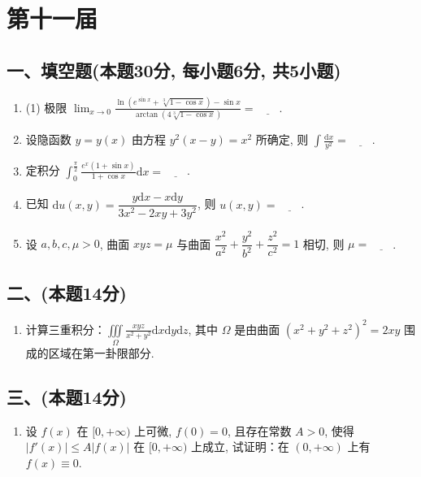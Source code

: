 \newpage
\section{第十一届}

\subsection*{一、填空题(本题30分,  每小题6分,  共5小题)}
\begin{enumerate}
    \item (1) 极限 $\displaystyle\lim_{x \to 0} \frac{\ln(e^{\sin x} + \sqrt[3]{1 - \cos x}) - \sin x}{\arctan(4 \sqrt[3]{1 - \cos x})} = \underline{\quad\quad}$.
    \item 设隐函数 $y = y(x)$ 由方程 $y^2(x - y) = x^2$ 所确定, 则 $\displaystyle\int \frac{\mathrm{d}x}{y^2} = \underline{\quad\quad}$.
    \item 定积分 $\displaystyle\int_0^{\frac{\pi}{2}} \frac{e^x (1 + \sin x)}{1 + \cos x}  \mathrm{d}x = \underline{\quad\quad}$.
    \item 已知 $\mathrm{d}u(x,  y) = \dfrac{y  \mathrm{d}x - x  \mathrm{d}y}{3x^2 - 2xy + 3y^2}$, 则 $u(x,  y) = \underline{\quad\quad}$.
    \item 设 $a,  b,  c,  \mu > 0$, 曲面 $xyz = \mu$ 与曲面 $\dfrac{x^2}{a^2} + \dfrac{y^2}{b^2} + \dfrac{z^2}{c^2} = 1$ 相切, 则 $\mu = \underline{\quad\quad}$.
\end{enumerate}

\subsection*{二、(本题14分)}
\begin{enumerate}[start=6]
    \item 计算三重积分：$\displaystyle\iiint\limits_{\Omega} \frac{xyz}{x^2 + y^2}  \mathrm{d}x  \mathrm{d}y  \mathrm{d}z$, 其中 $\Omega$ 是由曲面 $(x^2 + y^2 + z^2)^2 = 2xy$ 围成的区域在第一卦限部分.
\end{enumerate}

\subsection*{三、(本题14分)}
\begin{enumerate}[start=7]
    \item 设 $f(x)$ 在 $[0,  +\infty)$ 上可微, $f(0) = 0$, 且存在常数 $A > 0$, 使得 $|f'(x)| \leqslant A |f(x)|$ 在 $[0,  +\infty)$ 上成立, 试证明：在 $(0,  +\infty)$ 上有 $f(x) \equiv 0$.
\end{enumerate}

